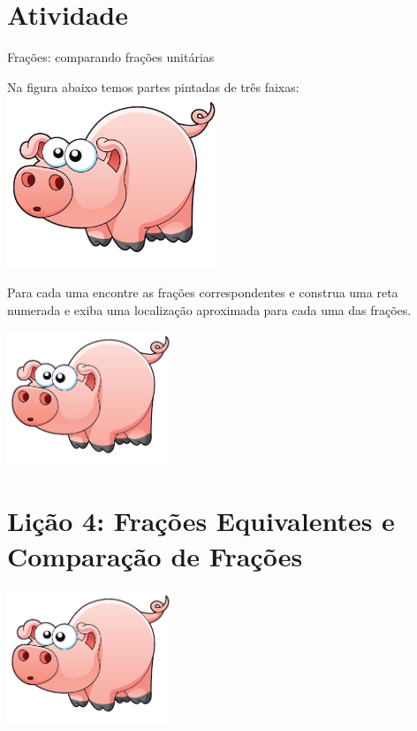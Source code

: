 \documentclass[a4,12pt]{book}
\begin{document}
\section{Atividade}



Frações: comparando frações unitárias



Na figura abaixo temos partes pintadas de três faixas:
\includegraphics[width=180pt, keepaspectratio]{pig}

Para cada uma encontre as frações correspondentes e construa uma reta numerada e exiba uma localização aproximada para cada uma das frações.


\includegraphics[width=\textwidth,height=4cm, keepaspectratio]{pig}

\section*{ Lição 4: Frações Equivalentes e Comparação de Frações }



\includegraphics[width=\textwidth,height=4cm, keepaspectratio]{pig}
\end{document}
